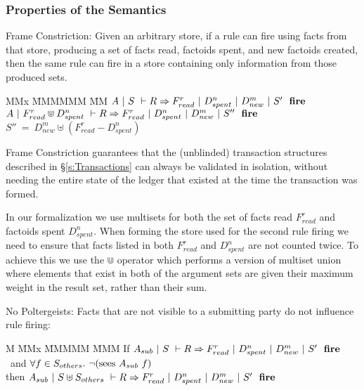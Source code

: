 \subsubsection{Properties of the Semantics}
\label{s:PropertiesOfSemantics}
\begin{theorem}
Frame Constriction:
Given an arbitrary store, if a rule can fire using facts from that store, producing a set of facts read, factoids spent, and new factoids created, then the same rule can fire in a store containing only information from those produced sets.
\end{theorem}
\begin{tabbing}
MMx \= MMMMMM \= MM \kill
{}     \> $A~|~S~\vdash R \Rightarrow F_{read}^r~|~D_{spent}^n~|~D_{new}^m~|~S'~~\textbf{fire}$ \\
   \> $A~|~F_{read}^r \Cup D_{spent}^n~\vdash R \Rightarrow F_{read}^r~|~D_{spent}^n~|~D_{new}^m~|~S''~~\textbf{fire}$ \\
             \>  $S'' ~=~ D_{new}^m \uplus (F_{read}^r - D_{spent}^n)$
\end{tabbing}

Frame Constriction guarantees that the (unblinded) transaction structures described in \S\ref{s:Transactions} can always be validated in isolation, without needing the entire state of the ledger that existed at the time the transaction was formed.

In our formalization we use multisets for both the set of facts read $F^r_{read}$ and factoids spent $D^n_{spent}$. When forming the store used for the second rule firing we need to ensure that facts listed in both $F^r_{read}$ and $D^n_{spent}$ are not counted twice. To achieve this we use the $\Cup$ operator which performs a version of multiset union where elements that exist in both of the argument sets are given their maximum weight in the result set, rather than their sum.



\begin{theorem}
No Poltergeists: Facts that are not visible to a submitting party do not influence rule firing:
\end{theorem}
\begin{tabbing}
M \= MMx \= MMMMM \= MMM \kill
\> If     \> $A_{sub}~|~S~\vdash R \Rightarrow F_{read}^r~|~D_{spent}^n~|~D_{new}^m~|~S'~~\textbf{fire}$ \\
\> ~and   \> $\forall f \in S_{others}.\ \neg (\textrm{sees}~ A_{sub}~ f)$ \\
\> then   \> $A_{sub}~|~S \uplus S_{others}~\vdash R \Rightarrow F_{read}^r~|~D_{spent}^n~|~D_{new}^m~|~S'~~\textbf{fire}$
\end{tabbing}

